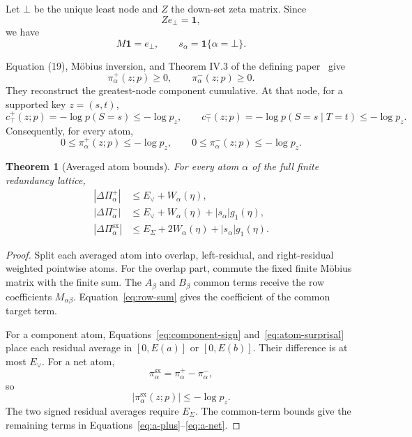 \documentclass[11pt]{article}
\newtheorem{theorem}{Theorem}[section]
\theoremstyle{definition}
\newcommand{\sx}{\mathrm{sx}}
\newcommand{\Ind}{\mathbf{1}}
\begin{document}
Let \(\bot\) be the unique least node and \(Z\) the down-set zeta matrix.  Since
\begin{equation}
  Z e_\bot=\mathbf1,
\end{equation}
we have
\begin{equation}\label{eq:row-sum}
  M\mathbf1=e_\bot,
  \qquad
  s_\alpha=\Ind\{\alpha=\bot\}.
\end{equation}

Equation (19), M{\"o}bius inversion, and Theorem IV.3 of the defining paper~\cite{makkeh2021}
give
\begin{equation}\label{eq:component-sign}
  \pi_\alpha^+(z;p)\ge0,
  \qquad
  \pi_\alpha^-(z;p)\ge0.
\end{equation}
They reconstruct the greatest-node component cumulative.  At that node, for a supported key
\(z=(s,t)\),
\begin{equation}
  c_\top^+(z;p)=-\log p(S=s)\le-\log p_z,
  \qquad
  c_\top^-(z;p)=-\log p(S=s\mid T=t)\le-\log p_z.
\end{equation}
Consequently, for every atom,
\begin{equation}\label{eq:atom-surprisal}
  0\le\pi_\alpha^+(z;p)\le-\log p_z,
  \qquad
  0\le\pi_\alpha^-(z;p)\le-\log p_z.
\end{equation}

\begin{theorem}[Averaged atom bounds]\label{thm:atoms}
For every atom \(\alpha\) of the full finite redundancy lattice,
\begin{align}
  |\Delta\Pi_\alpha^+|
  &\le E_\vee+W_\alpha(\eta),\label{eq:a-plus}\\
  |\Delta\Pi_\alpha^-|
  &\le E_\vee+W_\alpha(\eta)+|s_\alpha|g_1(\eta),\label{eq:a-minus}\\
  |\Delta\Pi_\alpha^\sx|
  &\le E_\Sigma+2W_\alpha(\eta)+|s_\alpha|g_1(\eta).
  \label{eq:a-net}
\end{align}
\end{theorem}

\begin{proof}
Split each averaged atom into overlap, left-residual, and right-residual weighted pointwise atoms.
For the overlap part, commute the fixed finite M{\"o}bius matrix with the finite sum.  The
\(A_\beta\) and \(B_\beta\) common terms receive the row coefficients \(M_{\alpha\beta}\).
Equation~\eqref{eq:row-sum} gives the coefficient of the common target term.

For a component atom, Equations~\eqref{eq:component-sign} and~\eqref{eq:atom-surprisal} place each
residual average in \([0,E(a)]\) or \([0,E(b)]\).  Their difference is at most \(E_\vee\).
For a net atom,
\begin{equation}
  \pi_\alpha^\sx=\pi_\alpha^+-\pi_\alpha^-,
\end{equation}
so
\begin{equation}
  |\pi_\alpha^\sx(z;p)|\le-\log p_z.
\end{equation}
The two signed residual averages require \(E_\Sigma\).  The common-term bounds give the remaining
terms in Equations~\eqref{eq:a-plus}--\eqref{eq:a-net}.
\end{proof}
\end{document}
